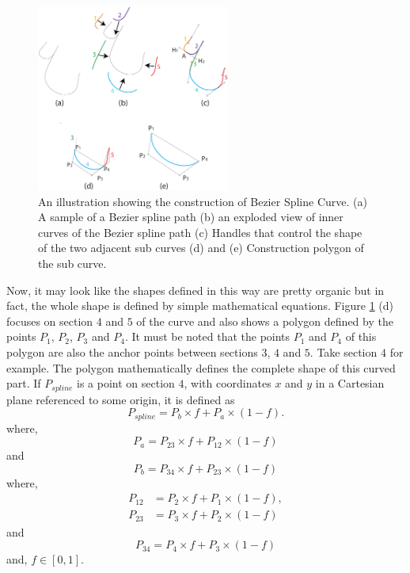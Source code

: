         \begin{figure}[!t]
            \centering
            \includegraphics[width=2.5in]{../Images/BezierSplineCurve.pdf}
            \caption{An illustration showing the construction of Bezier Spline Curve. (a) A sample of a Bezier spline path (b) an exploded view of inner curves of the Bezier spline path (c) Handles that control the shape of the two adjacent sub curves (d) and (e) Construction polygon of the sub curve.}
            \label{Fig:BezierSplines}
        \end{figure}

        Now, it may look like the shapes defined in this way are pretty organic but in fact, the whole shape is defined by simple mathematical equations. Figure \ref{Fig:BezierSplines} (d) focuses on section $4$ and $5$ of the curve and also shows a polygon defined by the points $P_1$, $P_2$, $P_3$ and  $P_4$. It must be noted that the points $P_1$ and $P_4$ of this polygon are also the anchor points between sections $3$, $4$ and $5$. Take section $4$ for example. The polygon mathematically defines the complete shape of this curved part. If $P_{spline}$ is a point on section $4$, with coordinates $x$ and $y$ in a Cartesian plane referenced to some origin, it is defined as
         \begin{equation}
         P_{spline}=P_b×f+P_a×(1 -f).
         \end{equation}
where,
\begin{equation}
P_a=P_{23}×f+P_{12}×(1 -f)
\end{equation}
and
\begin{equation}
P_b=P_{34}×f+P_{23}×(1 -f)
\end{equation}
where,
\begin{align}
P_{12}&=P_2×f+P_1×(1 -f), \\
P_{23}&=P_3×f+P_2×(1 -f)
\end{align}
and
\begin{equation}
P_{34}=P_4×f+P_3×(1 -f)
\end{equation}
and, $f \in [0, 1]$.

